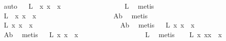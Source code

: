 \begin{isabellebody}
\ auto\isanewline
\ \isamarkupfalse%
\ L{}{\isacharcolon}\ \ {\isachardoublequoteopen}{\isasymforall}x{\isachardot}\ {\isasymbox}{\isasymbox}{\isacharparenleft}x{\isasymbox}{\isacharparenright}\ {\isasymapprox}\ {\isasymbox}{\isacharparenleft}x{\isasymbox}{\isacharparenright}{\isachardoublequoteclose}\ \ \ \ \ \ \ \ \ \ \ \ \ \ \ \ \ \isamarkupfalse%
\ L{}\ \isamarkupfalse%
\ metis\isanewline
\ \isamarkupfalse%
\ L{}{\isacharcolon}\ \ {\isachardoublequoteopen}{\isasymforall}x{\isachardot}\ {\isasymbox}{\isasymbox}{\isacharparenleft}x{\isasymbox}{\isacharparenright}\ {\isasymapprox}\ {\isasymbox}x{\isachardoublequoteclose}\ \ \ \ \ \ \ \ \ \ \ \ \ \ \ \ \ \ \ \ \ \isamarkupfalse%
\ A{}b\ \isamarkupfalse%
\ metis\isanewline
\ \isamarkupfalse%
\ L{}{}{\isacharcolon}\ {\isachardoublequoteopen}{\isasymforall}x{\isachardot}\ {\isasymbox}{\isasymbox}x\ {\isasymapprox}\ {\isasymbox}x{\isachardoublequoteclose}\ \ \ \ \ \ \ \ \ \ \ \ \ \ \ \ \ \ \ \ \ \ \ \ \isamarkupfalse%
\ A{}b\ \isamarkupfalse%
\ metis\isanewline
\ \isamarkupfalse%
\ L{}{}{\isacharcolon}\ {\isachardoublequoteopen}{\isasymforall}x{\isachardot}\ {\isasymbox}{\isasymbox}{\isacharparenleft}{\isacharparenleft}{\isasymbox}x{\isacharparenright}{\isasymbox}{\isacharparenright}\ {\isasymapprox}\ {\isasymbox}{\isasymbox}{\isacharparenleft}x{\isasymbox}{\isacharparenright}{\isachardoublequoteclose}\ \ \ \ \ \ \ \ \ \ \ \ \ \isamarkupfalse%
\ A{}b\ \isamarkupfalse%
\ metis\isanewline
\ \isamarkupfalse%
\ L{}{}{\isacharcolon}\ {\isachardoublequoteopen}{\isasymforall}x{\isachardot}\ {\isasymbox}{\isasymbox}{\isacharparenleft}{\isacharparenleft}{\isasymbox}x{\isacharparenright}{\isasymbox}{\isacharparenright}\ {\isasymapprox}\ {\isasymbox}x{\isachardoublequoteclose}\ \ \ \ \ \ \ \ \ \ \ \ \ \ \ \ \ \ \isamarkupfalse%
\ L{}\ \isamarkupfalse%
\ metis\isanewline
\ \isamarkupfalse%
\ \ L{}{}{\isacharcolon}\ {\isachardoublequoteopen}{\isasymforall}x{\isachardot}\ {\isacharparenleft}{\isasymbox}{\isasymbox}{\isacharparenleft}{\isacharparenleft}{\isasymbox}x{\isacharparenright}{\isasymbox}{\isacharparenright}{\isacharparenright}{\isasymcdot}{\isacharparenleft}{\isacharparenleft}{\isasymbox}x{\isacharparenright}{\isasymbox}{\isacharparenright}\ {\isasymapprox}\ {\isacharparenleft}{\isacharparenleft}{\isasymbox}x{\isacharparenright}{\isasymbox}{\isacharparenright}{\isachardoublequoteclose}\ \ \isamarkupfalse%

\end{isabellebody}
